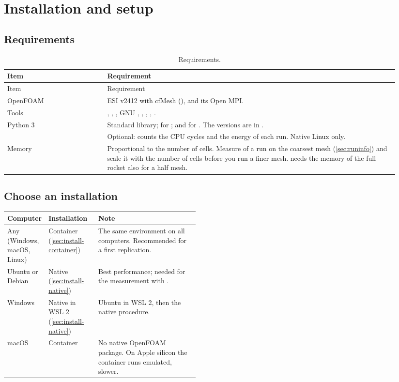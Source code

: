 \chapter{Installation and setup}\label{ch:setup}

\section{Requirements}

\begin{longtable}{@{}P{0.24\linewidth} P{0.70\linewidth}@{}}
\caption{Requirements.}\label{tab:requirements}\\
\toprule
Item & Requirement \\
\midrule
\endfirsthead
\toprule
Item & Requirement \\
\midrule
\endhead
OpenFOAM & ESI v2412 with cfMesh (), and its Open MPI. \\
Tools & , , , GNU , , , , . \\
Python 3 & Standard library;  for ;  and  for . The versions are in . \\
 & Optional: counts the CPU cycles and the energy of each run. Native Linux only. \\
Memory & Proportional to the number of cells. Measure  of a run on the coarsest mesh (\cref{sec:runinfo}) and scale it with the number of cells before you run a finer mesh.  needs the memory of the full rocket also for a half mesh. \\
\bottomrule
\end{longtable}

\section{Choose an installation}\label{sec:install}

\begin{tabularx}{\linewidth}{@{}P{0.20\linewidth} P{0.26\linewidth} L@{}}
\toprule
Computer & Installation & Note \\
\midrule
Any (Windows, macOS, Linux) & Container (\cref{sec:install-container}) & The same environment on all computers. Recommended for a first replication. \\
Ubuntu or Debian & Native (\cref{sec:install-native}) & Best performance; needed for the measurement with . \\
Windows & Native in WSL 2 (\cref{sec:install-native}) & Ubuntu in WSL 2, then the native procedure. \\
macOS & Container & No native OpenFOAM package. On Apple silicon the container runs emulated, slower. \\
\bottomrule
\end{tabularx}

